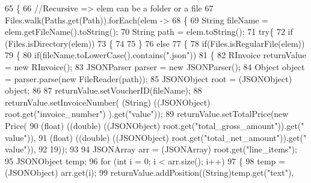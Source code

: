 \begin{DoxyCode}
65     \{
66         \textcolor{comment}{//Recursive => elem can be a folder or a file }
67         Files.walk(Paths.get(Path)).forEach(elem ->
68         \{
69             String fileName = elem.getFileName().toString();
70             String path = elem.toString();
71             \textcolor{keywordflow}{try}\{
72                 \textcolor{keywordflow}{if} (Files.isDirectory(elem))
73                 \{
74                     
75                 \}
76                 \textcolor{keywordflow}{else}
77                 \{
78                     \textcolor{keywordflow}{if}(Files.isRegularFile(elem))
79                     \{
80                         \textcolor{keywordflow}{if}(fileName.toLowerCase().contains(\textcolor{stringliteral}{".json"}))
81                         \{
82                             RInvoice returnValue = \textcolor{keyword}{new} RInvoice(); 
83                             JSONParser parser = \textcolor{keyword}{new} JSONParser();
84                             Object \textcolor{keywordtype}{object} = parser.parse(\textcolor{keyword}{new} FileReader(path));
85                             JSONObject root = (JSONObject) \textcolor{keywordtype}{object};
86                             
87                             returnValue.setVoucherID(fileName);
88                             returnValue.setInvoiceNumber( (String) ((JSONObject) root.get(\textcolor{stringliteral}{"invoice\_number"})
      ).\textcolor{keyword}{get}(\textcolor{stringliteral}{"value"}));
89                             returnValue.setTotalPrice(\textcolor{keyword}{new} Price(
90                                     (\textcolor{keywordtype}{float}) ((\textcolor{keywordtype}{double}) ((JSONObject) root.get(\textcolor{stringliteral}{"total\_gross\_amount"})).\textcolor{keyword}{get}(\textcolor{stringliteral}{"
      value"})),
91                                     (\textcolor{keywordtype}{float}) ((double) ((JSONObject) root.get(\textcolor{stringliteral}{"total\_net\_amount"})).\textcolor{keyword}{get}(\textcolor{stringliteral}{"
      value"})),
92                                     19));           
93                             
94                             JSONArray arr = (JSONArray) root.get(\textcolor{stringliteral}{"line\_items"});
95                             JSONObject temp;
96                             \textcolor{keywordflow}{for} (\textcolor{keywordtype}{int} i = 0; i < arr.size(); i++)
97                             \{
98                                 temp = (JSONObject) arr.get(i);
99                                 returnValue.addPosition((String)temp.get(\textcolor{stringliteral}{"text"}), 

\end{DoxyCode}
